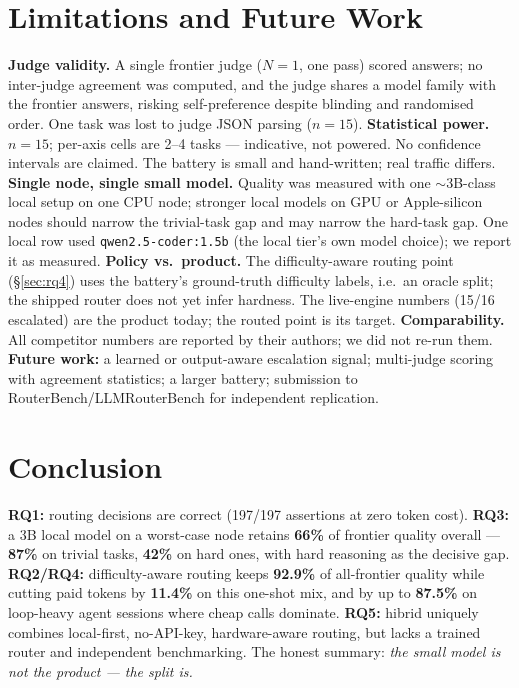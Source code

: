 \documentclass[10pt]{article} %
\begin{document}
\section{Limitations and Future Work}
\label{sec:limitations}

\textbf{Judge validity.} A single frontier judge ($N{=}1$, one pass) scored answers; no inter-judge agreement was computed, and the judge shares a model family with the frontier answers, risking self-preference despite blinding and randomised order. One task was lost to judge JSON parsing ($n{=}15$).
\textbf{Statistical power.} $n{=}15$; per-axis cells are 2--4 tasks --- indicative, not powered. No confidence intervals are claimed. The battery is small and hand-written; real traffic differs.
\textbf{Single node, single small model.} Quality was measured with one ${\sim}$3B-class local setup on one CPU node; stronger local models on GPU or Apple-silicon nodes should narrow the trivial-task gap and may narrow the hard-task gap. One local row used \texttt{qwen2.5-coder:1.5b} (the local tier's own model choice); we report it as measured.
\textbf{Policy vs.\ product.} The difficulty-aware routing point (\S\ref{sec:rq4}) uses the battery's ground-truth difficulty labels, i.e.\ an oracle split; the shipped router does not yet infer hardness. The live-engine numbers (15/16 escalated) are the product today; the routed point is its target.
\textbf{Comparability.} All competitor numbers are reported by their authors; we did not re-run them.
\textbf{Future work:} a learned or output-aware escalation signal; multi-judge scoring with agreement statistics; a larger battery; submission to RouterBench/LLMRouterBench for independent replication.

\section{Conclusion}
\label{sec:conclusion}

\textbf{RQ1:} routing decisions are correct (197/197 assertions at zero token cost). \textbf{RQ3:} a 3B local model on a worst-case node retains \textbf{66\%} of frontier quality overall --- \textbf{87\%} on trivial tasks, \textbf{42\%} on hard ones, with hard reasoning as the decisive gap. \textbf{RQ2/RQ4:} difficulty-aware routing keeps \textbf{92.9\%} of all-frontier quality while cutting paid tokens by \textbf{11.4\%} on this one-shot mix, and by up to \textbf{87.5\%} on loop-heavy agent sessions where cheap calls dominate. \textbf{RQ5:} hibrid uniquely combines local-first, no-API-key, hardware-aware routing, but lacks a trained router and independent benchmarking. The honest summary: \emph{the small model is not the product --- the split is.}
\end{document}
